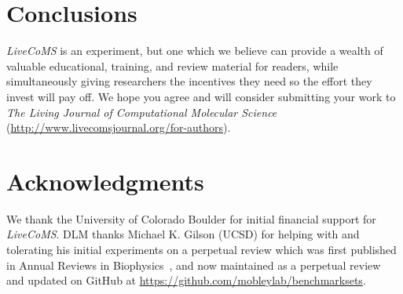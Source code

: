 \documentclass[9pt,editorial]{livecoms}
\begin{document}
\section{Conclusions}

\emph{LiveCoMS} is an experiment, but one which we believe can provide a wealth of valuable educational, training, and review material for readers, while simultaneously giving researchers the incentives they need so the effort they invest will pay off.
We hope you agree and will consider submitting your work to \emph{The Living Journal of Computational Molecular Science} (\url{http://www.livecomsjournal.org/for-authors}).


\section{Acknowledgments}

We thank the University of Colorado Boulder for initial financial support for \emph{LiveCoMS}. 
DLM thanks Michael K. Gilson (UCSD) for helping with and tolerating his initial experiments on a perpetual review which was first published in Annual Reviews in Biophysics~\cite{Mobley:2017:AnnualReviewofBiophysics}, and now maintained as a perpetual review~\cite{Mobley:2017:eScholarshipa} and updated on GitHub at \url{https://github.com/mobleylab/benchmarksets}.


\end{document}
